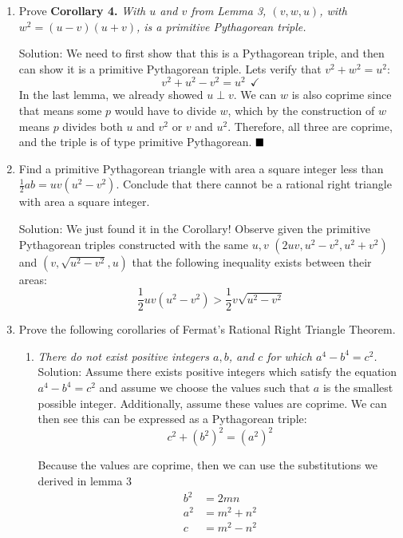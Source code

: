 \documentclass[10pt]{article}
\newcommand{\solution}{\color{blue} Solution: \color{black}}
\begin{document}
\begin{enumerate}
		\item Prove {\bf Corollary 4.} \emph{With $u$ and $v$ from Lemma 3, $(v,w,u)$, with $w^2 = (u-v)(u+v)$, is a primitive Pythagorean triple.}
            
            \solution We need to first show that this is a Pythagorean triple, and then can show it is a primitive Pythagorean triple. Lets verify that $v^2 + w^2 = u^2$:
            \[v^2 + u^2 - v^2 = u^2 ~~\checkmark\]
		    In the last lemma, we already showed $u \perp v$. We can $w$ is also coprime since that means some $p$ would have to divide $w$, which by the construction of $w$ means $p$ divides both $u$ and $v^2$ or $v$ and $u^2$. Therefore, all three are coprime, and the triple is of type primitive Pythagorean. $\hfill\blacksquare$
		\item Find a primitive Pythagorean triangle with area a square integer less than $\frac{1}{2}ab = uv(u^2-v^2)$. 
		Conclude that there cannot be a rational right triangle with area a square integer. 
        
        \solution We just found it in the Corollary! Observe given the primitive Pythagorean triples constructed with the same $u,v$ $(2uv, u^2 - v^2, u^2 + v^2)$ and $(v, \sqrt{u^2 - v^2}, u)$ that the following inequality exists between their areas: 
        \[\frac{1}{2} uv(u^2 - v^2) > \frac{1}{2}v\sqrt{u^2 - v^2}\]
		
		\item Prove the following corollaries of Fermat's Rational Right Triangle Theorem.
		
		\begin{enumerate}
			\item \emph{There do not exist positive integers $a, b$, and $c$ for which $a^4 - b^4 = c^2$.}\\

			    \solution Assume there exists positive integers which satisfy the equation $a^4 - b^4 = c^2$ and assume we choose the values such that $a$ is the smallest possible integer. Additionally, assume these values are coprime. We can then see this can be expressed as a Pythagorean triple:
                \[c^2 + (b^2)^2 = (a^2)^2 \]

                Because the values are coprime, then we can use the substitutions we derived in lemma 3
                \begin{align*}
                    b^2 &= 2mn\\
                    a^2 &= m^2 + n^2\\
                    c   &= m^2 - n^2
                \end{align*}


\end{enumerate}
\end{enumerate}
\end{document}
